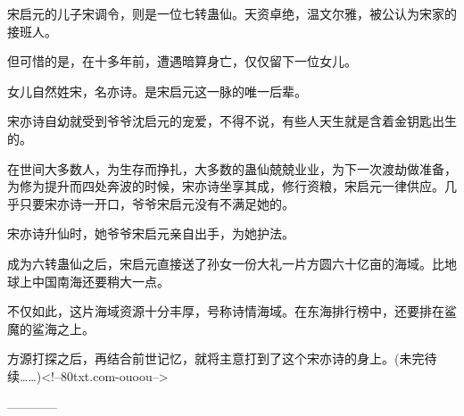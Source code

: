 \begin{this_body}
宋启元的儿子宋调令，则是一位七转蛊仙。天资卓绝，温文尔雅，被公认为宋家的接班人。

但可惜的是，在十多年前，遭遇暗算身亡，仅仅留下一位女儿。

女儿自然姓宋，名亦诗。是宋启元这一脉的唯一后辈。

宋亦诗自幼就受到爷爷沈启元的宠爱，不得不说，有些人天生就是含着金钥匙出生的。

在世间大多数人，为生存而挣扎，大多数的蛊仙兢兢业业，为下一次渡劫做准备，为修为提升而四处奔波的时候，宋亦诗坐享其成，修行资粮，宋启元一律供应。几乎只要宋亦诗一开口，爷爷宋启元没有不满足她的。

宋亦诗升仙时，她爷爷宋启元亲自出手，为她护法。

成为六转蛊仙之后，宋启元直接送了孙女一份大礼一片方圆六十亿亩的海域。比地球上中国南海还要稍大一点。

不仅如此，这片海域资源十分丰厚，号称诗情海域。在东海排行榜中，还要排在鲨魔的鲨海之上。

方源打探之后，再结合前世记忆，就将主意打到了这个宋亦诗的身上。(未完待续……)<!--80txt.com-ouoou-->

------------

\end{this_body}


